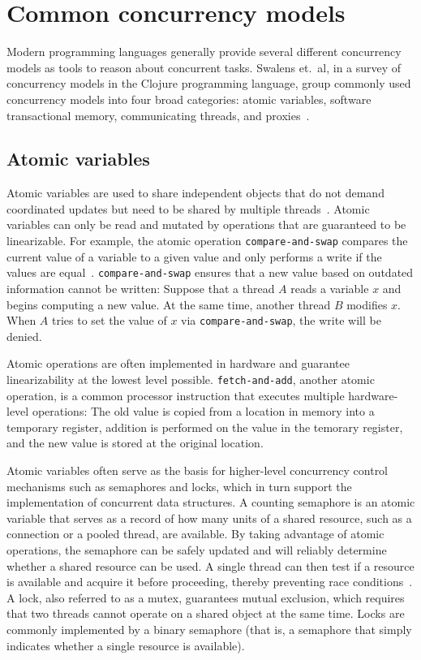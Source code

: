 \documentclass{sig-alternate}
\newcommand{\code}[1]{\texttt{#1}}
\begin{document}
\section{Common concurrency models}

Modern programming languages generally provide several different concurrency models as tools to reason about concurrent tasks. Swalens et.\ al, in a survey of concurrency models in the Clojure programming language, group commonly used concurrency models into four broad categories: atomic variables, software transactional memory, communicating threads, and proxies~\cite{Swalens2014}.

\subsection{Atomic variables}

Atomic variables are used to share independent objects that do not demand coordinated updates but need to be shared by multiple threads~\cite{Swalens2014}. Atomic variables can only be read and mutated by operations that are guaranteed to be linearizable. For example, the atomic operation \code{compare-and-swap} compares the current value of a variable to a given value and only performs a write if the values are equal~\cite{Swalens2014}. \code{compare-and-swap} ensures that a new value based on outdated information cannot be written: Suppose that a thread $A$ reads a variable $x$ and begins computing a new value. At the same time, another thread $B$ modifies $x$. When $A$ tries to set the value of $x$ via \code{compare-and-swap}, the write will be denied.

Atomic operations are often implemented in hardware and guarantee linearizability at the lowest level possible. \code{fetch-and-add}, another atomic operation, is a common processor instruction that executes multiple hardware-level operations: The old value is copied from a location in memory into a temporary register, addition is performed on the value in the temorary register, and the new value is stored at the original location.

Atomic variables often serve as the basis for higher-level concurrency control mechanisms such as semaphores and locks, which in turn support the implementation of concurrent data structures. A counting semaphore is an atomic variable that serves as a record of how many units of a shared resource, such as a connection or a pooled thread, are available. By taking advantage of atomic operations, the semaphore can be safely updated and will reliably determine whether a shared resource can be used. A single thread can then test if a resource is available and acquire it before proceeding, thereby preventing race conditions~\cite{Swalens2014}. A lock, also referred to as a mutex, guarantees mutual exclusion, which requires that two threads cannot operate on a shared object at the same time. Locks are commonly implemented by a binary semaphore (that is, a semaphore that simply indicates whether a single resource is available).
\end{document}
